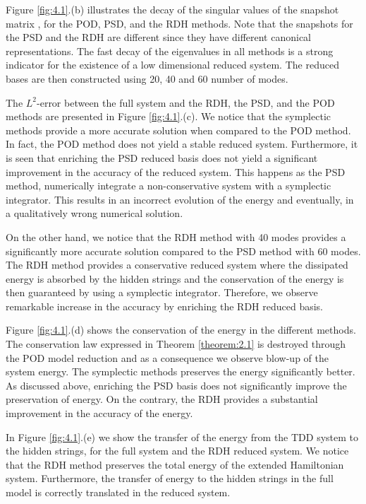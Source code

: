 Figure \ref{fig:4.1}.(b) illustrates the decay of the singular values of the snapshot matrix \cite{hesthaven2015certified}, for the POD, PSD, and the RDH methods. Note that the snapshots for the PSD and the RDH are different since they have different canonical representations. The fast decay of the eigenvalues in all methods is a strong indicator for the existence of a low dimensional reduced system. The reduced bases are then constructed using 20, 40 and 60 number of modes.

The $L^2$-error between the full system and the RDH, the PSD, and the POD methods are presented in Figure \ref{fig:4.1}.(c). We notice that the symplectic methods provide a more accurate solution when compared to the POD method. In fact, the POD method does not yield a stable reduced system.  Furthermore, it is seen that enriching the PSD reduced basis does not yield a significant improvement in the accuracy of the reduced system. This happens as the PSD method, numerically integrate a non-conservative system with a symplectic integrator. This results in an incorrect evolution of the energy and eventually, in a qualitatively wrong numerical solution.

On the other hand, we notice that the RDH method with 40 modes provides a significantly more accurate solution compared to the PSD method with 60 modes. The RDH method provides a conservative reduced system where the dissipated energy is absorbed by the hidden strings and the conservation of the energy is then guaranteed by using a symplectic integrator. Therefore, we observe remarkable increase in the accuracy by enriching the RDH reduced basis.

Figure \ref{fig:4.1}.(d) shows the conservation of the energy in the different methods. The conservation law expressed in Theorem \ref{theorem:2.1} is destroyed through the POD model reduction and as a consequence we observe blow-up of the system energy. The symplectic methods preserves the energy significantly better. As discussed above, enriching the PSD basis does not significantly improve the preservation of energy. On the contrary, the RDH provides a substantial improvement in the accuracy of the energy.

In Figure \ref{fig:4.1}.(e) we show the transfer of the energy from the TDD system to the hidden strings, for the full system and the RDH reduced system. We notice that the RDH method preserves the total energy of the extended Hamiltonian system. Furthermore, the transfer of energy to the hidden strings in the full model is correctly translated in the reduced system.

